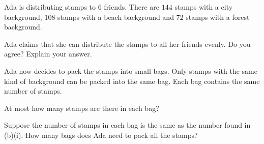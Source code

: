  Ada is distributing stamps to $6$ friends. There are $144$ stamps with a city background, $108$ stamps with a beach background and $72$ stamps with a forest background.

\begin{subparts}
  \item Ada claims that she can distribute the stamps to all her friends evenly. Do you agree? Explain your answer.
  \item Ada now decides to pack the stamps into small bags. Only stamps with the same kind of background can be packed into the same bag. Each bag contains the same number of stamps.
  \begin{subpartsii}
    \item At most how many stamps are there in each bag?
    \item Suppose the number of stamps in each bag is the same as the number found in (b)(i). How many bags does Ada need to pack all the stamps?
  \end{subpartsii}
\end{subparts}

